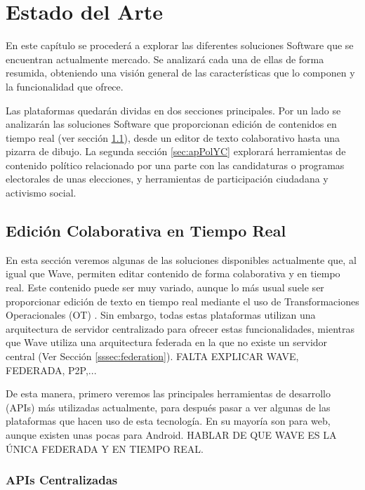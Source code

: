 \newpage
\thispagestyle{sectioned}
\chapter{Estado del Arte}

En este capítulo se procederá a explorar las diferentes soluciones Software que se encuentran actualmente mercado. Se analizará cada una de ellas de forma resumida, obteniendo una visión general de las características que lo componen y la funcionalidad que ofrece.

Las plataformas quedarán dividas en dos secciones principales. Por un lado se analizarán las soluciones Software que proporcionan edición de contenidos en tiempo real (ver sección \ref{sec:ecitColArt}), desde un editor de texto colaborativo hasta una pizarra de dibujo. La segunda sección \ref{sec:apPolYC} explorará herramientas de contenido político relacionado por una parte con las candidaturas o programas electorales de unas elecciones, y herramientas de participación ciudadana y activismo social.

\section{Edición Colaborativa en Tiempo Real}\label{sec:ecitColArt}

En esta sección veremos algunas de las soluciones disponibles actualmente que, al igual que Wave, permiten editar contenido de forma colaborativa y en tiempo real. Este contenido puede ser muy variado, aunque lo más usual suele ser proporcionar edición de texto en tiempo real mediante el uso de Transformaciones Operacionales (OT) \cite{ref:how_ot_works}. Sin embargo, todas estas plataformas utilizan una arquitectura de servidor centralizado para ofrecer estas funcionalidades, mientras que Wave utiliza una arquitectura federada en la que no existe un servidor central (Ver Sección \ref{sssec:federation}). FALTA EXPLICAR WAVE, FEDERADA, P2P,...

De esta manera, primero veremos las principales herramientas de desarrollo (APIs) más utilizadas actualmente, para después pasar a ver algunas de las plataformas que hacen uso de esta tecnología. En su mayoría son para web, aunque existen unas pocas para Android. HABLAR DE QUE WAVE ES LA ÚNICA FEDERADA Y EN TIEMPO REAL.
	
	\subsection{APIs Centralizadas}
	
